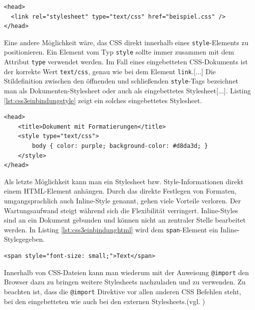 \vspace{1em}
\begin{lstlisting}[language=HTML5, caption=Stylesheet Einbindung über \texttt{link}-Element, label=lst:css3einbindunglink]
<head>
  <link rel="stylesheet" type="text/css" href="beispiel.css" />
</head>
\end{lstlisting}

Eine andere Möglichkeit wäre, das CSS direkt innerhalb eines \texttt{style}-Elements zu positionieren. Ein Element vom Typ \glqq \texttt{style} sollte immer zusammen mit dem Attribut \texttt{type} verwendet werden. Im Fall eines eingebetteten CSS-Dokuments ist der korrekte Wert \texttt{text/css}, genau wie bei dem Element \texttt{link}.[...] Die Stildefinition zwischen den öffnenden und schließenden \texttt{style}-Tags bezeichnet man als Dokumenten-Stylesheet oder auch als eingebettetes Stylesheet[...].\grqq{}\cite[S.19]{MeyeCasc2005} Listing \ref{lst:css3einbindungstyle} zeigt ein solches eingebettetes Stylesheet.

\vspace{1em}
\begin{lstlisting}[language=HTML5, caption=Stylesheet Einbindung über \texttt{style}-Element, label=lst:css3einbindungstyle]
<head>
	<title>Dokument mit Formatierungen</title>
	<style type="text/css">
		body { color: purple; background-color: #d8da3d; }
	</style>
</head>
\end{lstlisting}
	
Als letzte Möglichkeit kann man ein Stylesheet bzw. Style-Informationen direkt einem HTML-Element anhängen. \glqq Durch das direkte Festlegen von Formaten, umgangsprachlich auch \glqq Inline-Style\grqq{} genannt, gehen viele Vorteile verloren. Der Wartungsaufwand steigt während sich die Flexibilität verringert. Inline-Styles sind an ein Dokument gebunden und können nicht an zentraler Stelle bearbeitet werden.\grqq{}\cite{SelfHtml20144} In Listing \ref{lst:css3einbindunghtml} wird dem \texttt{span}-Element ein \glqq Inline-Style\grqq gegeben.

\vspace{1em}
\begin{lstlisting}[language=HTML5, caption=Stylesheet Einbindung in \texttt{html}-Element, label=lst:css3einbindunghtml]
<span style="font-size: small;">Text</span>
\end{lstlisting}
	
Innerhalb von CSS-Dateien kann man wiederum mit der Anweisung \texttt{@import} den Browser dazu zu bringen weitere Stylesheets nachzuladen und zu verwenden. Zu beachten ist, dass die \texttt{@import} Direktive vor allen anderen CSS Befehlen steht, bei den eingebetteten wie auch bei den externen Stylesheets.(vgl. \cite[S.20]{MeyeCasc2005})

